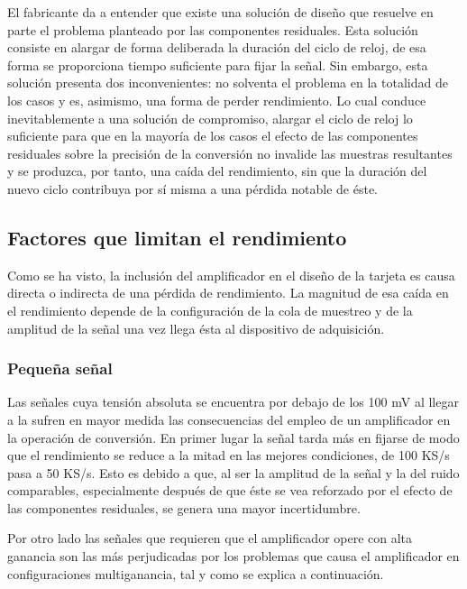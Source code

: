 El fabricante da a entender que existe una solución de diseño que resuelve en parte el problema planteado por las componentes residuales. Esta solución consiste en alargar de forma deliberada la duración del ciclo de reloj, de esa forma se proporciona tiempo suficiente para fijar la señal. Sin embargo, esta solución presenta dos inconvenientes: no solventa el problema en la totalidad de los casos y es, asimismo, una forma de perder rendimiento. Lo cual conduce inevitablemente a una solución de compromiso, alargar el ciclo de reloj lo suficiente para que en la mayoría de los casos el efecto de las componentes residuales sobre la precisión de la conversión no invalide las muestras resultantes y se produzca, por tanto, una caída del rendimiento, sin que la duración del nuevo ciclo contribuya por sí misma a una pérdida notable de éste.\par


\subsection{Factores que limitan el rendimiento}

Como se ha visto, la inclusión del amplificador en el diseño de la tarjeta es causa directa o indirecta de una pérdida de rendimiento. La magnitud de esa caída en el rendimiento depende de la configuración de la cola de muestreo y de la amplitud de la señal una vez llega ésta al dispositivo de adquisición.

\subsubsection{Pequeña señal}

Las señales cuya tensión absoluta se encuentra por debajo de los 100 mV al llegar a la \kpci{} sufren en mayor medida las consecuencias del empleo de un amplificador en la operación de conversión. En primer lugar la señal tarda más en fijarse de modo que el rendimiento se reduce a la mitad en las mejores condiciones, de 100 KS/s pasa a 50 KS/s. Esto es debido a que, al ser la amplitud de la señal y la del ruido comparables, especialmente después de que éste se vea reforzado por el efecto de las componentes residuales, se genera una mayor incertidumbre.\par
Por otro lado las señales que requieren que el amplificador opere con alta ganancia son las más perjudicadas por los problemas que causa el amplificador en configuraciones multiganancia, tal y como se explica a continuación.



